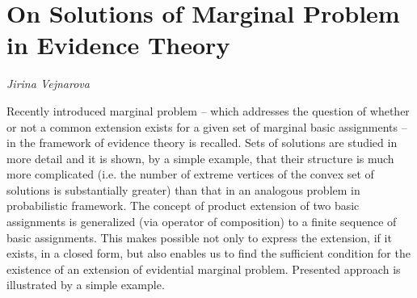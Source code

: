 \documentclass[../booklet.tex]{subfiles}
\begin{document}
\section[On Solutions of Marginal Problem in Evidence Theory. {\it Jirina Vejnarova}]{On Solutions of Marginal Problem in Evidence Theory}

\begin{center}
  {\it Jirina Vejnarova}
\end{center}

\vskip 0.8cm


Recently introduced marginal problem -- which addresses the question
of whether or not a common extension exists for a given set of
marginal basic assignments -- in the framework of evidence theory is
recalled. Sets of solutions are studied in more detail and it is
shown, by a simple example, that their structure is much more
complicated (i.e. the number of extreme vertices of the convex set
of solutions is substantially greater) than that in an analogous
problem in probabilistic framework. The concept of product extension
of two basic assignments is generalized (via operator of
composition) to a finite sequence of basic assignments. This makes
possible not only to express the extension, if it exists, in a
closed form, but also enables us to find the sufficient condition
for the existence of an extension of evidential marginal problem.
Presented approach is illustrated by a simple example.

\end{document}

